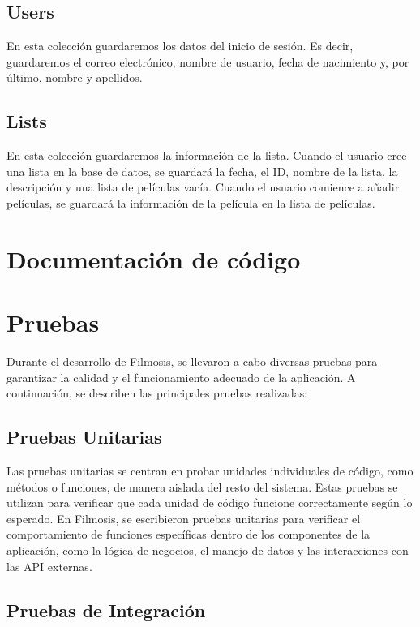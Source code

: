 \documentclass{article}
\begin{document}
    \subsection{Users}
    En esta colección guardaremos los datos del inicio de sesión. Es decir, guardaremos el correo electrónico, nombre de usuario, fecha de nacimiento y, por último, nombre y apellidos.
    
    \subsection{Lists}
    En esta colección guardaremos la información de la lista. Cuando el usuario cree una lista en la base de datos, se guardará la fecha, el ID, nombre de la lista, la descripción y una lista de películas vacía. Cuando el usuario comience a añadir películas, se guardará la información de la película en la lista de películas.

\section{Documentación de código}

\section{Pruebas}

Durante el desarrollo de Filmosis, se llevaron a cabo diversas pruebas para garantizar la calidad y el funcionamiento adecuado de la aplicación. A continuación, se describen las principales pruebas realizadas:

\subsection{Pruebas Unitarias}

Las pruebas unitarias se centran en probar unidades individuales de código, como métodos o funciones, de manera aislada del resto del sistema. Estas pruebas se utilizan para verificar que cada unidad de código funcione correctamente según lo esperado. En Filmosis, se escribieron pruebas unitarias para verificar el comportamiento de funciones específicas dentro de los componentes de la aplicación, como la lógica de negocios, el manejo de datos y las interacciones con las API externas.

\subsection{Pruebas de Integración}
\end{document}
